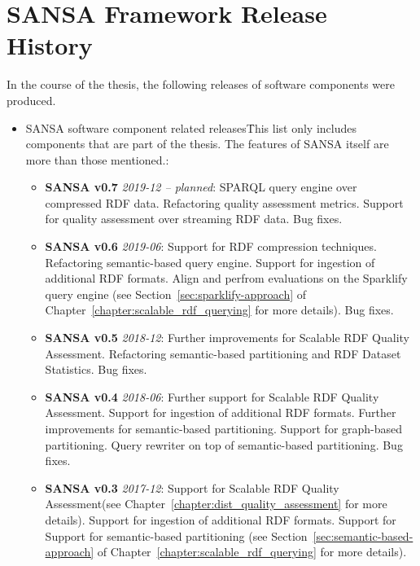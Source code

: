 \chapter{SANSA Framework Release History}
\label{sec:appendix-sansa-releases}

In the course of the thesis, the following releases of software components were produced.

\begin{itemize}
    \item SANSA software component related releases\f{This list only includes components that are part of the thesis. 
    The features of SANSA itself are more than those mentioned.}:
    \begin{itemize}
        
        \item \textbf{SANSA v0.7} \textit{2019-12 -- planned}:
        SPARQL query engine over compressed RDF data.
        Refactoring quality assessment metrics.
        Support for quality assessment over streaming RDF data.
        Bug fixes.
        
        \item \textbf{SANSA v0.6} \textit{2019-06}:
        Support for RDF compression techniques.
        Refactoring semantic-based query engine.
        Support for ingestion of additional RDF formats.
        Align and perfrom evaluations on the Sparklify query engine (see Section~\ref{sec:sparklify-approach} of Chapter~\ref{chapter:scalable_rdf_querying} for more details).
        Bug fixes.
        
        \item \textbf{SANSA v0.5} \textit{2018-12}: 
        Further improvements for Scalable RDF Quality Assessment. 
        Refactoring semantic-based partitioning and RDF Dataset Statistics.
        Bug fixes.
        
        \item \textbf{SANSA v0.4} \textit{2018-06}:
        Further support for Scalable RDF Quality Assessment. 
        Support for ingestion of additional RDF formats.
        Further improvements for semantic-based partitioning.
        Support for graph-based partitioning.
        Query rewriter on top of semantic-based partitioning.
        Bug fixes.
        
        \item \textbf{SANSA v0.3} \textit{2017-12}: 
        Support for Scalable RDF Quality Assessment(see Chapter~\ref{chapter:dist_quality_assessment} for more details). 
        Support for ingestion of additional RDF formats.
        Support for Support for semantic-based partitioning (see Section~\ref{sec:semantic-based-approach} of Chapter~\ref{chapter:scalable_rdf_querying} for more details).
        

\end{itemize}
\end{itemize}
